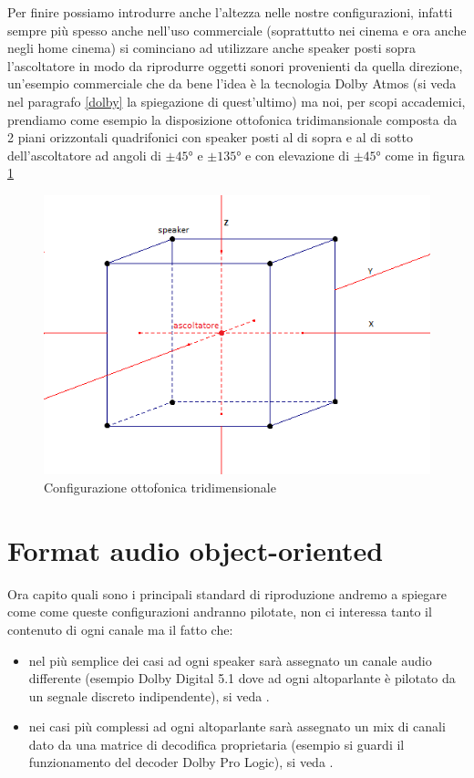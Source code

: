 \documentclass[12pt,a4paper]{report}
\begin{document}
Per finire possiamo introdurre anche l'altezza nelle nostre configurazioni, infatti sempre più spesso anche nell'uso commerciale (soprattutto nei cinema e ora anche negli home cinema) si cominciano ad utilizzare anche speaker posti sopra l'ascoltatore in modo da riprodurre oggetti sonori provenienti da quella direzione, un'esempio commerciale che da bene l'idea è la tecnologia Dolby Atmos (si veda nel paragrafo \ref{dolby} la spiegazione di quest'ultimo) ma noi, per scopi accademici, prendiamo come esempio la disposizione ottofonica tridimansionale composta da 2 piani orizzontali quadrifonici con speaker posti al di sopra e al di sotto dell'ascoltatore ad angoli di $\pm45°$ e $\pm135°$ e con elevazione di $\pm 45°$ come in figura \ref{fig:ottofonia}

\begin{figure}[htbp]
	\centering
	\includegraphics[scale=0.70]{figures/cubo4.png}
	\caption {Configurazione ottofonica tridimensionale} 
	\label{fig:ottofonia}
	\end{figure}

\section{Format audio object-oriented}

Ora capito quali sono i principali standard di riproduzione andremo a spiegare come come queste configurazioni andranno pilotate, non ci interessa tanto il contenuto di ogni canale ma il fatto che: 

\begin{itemize}
\item nel più semplice dei casi ad ogni speaker sarà assegnato un canale audio differente (esempio Dolby Digital 5.1 dove ad ogni altoparlante è pilotato da un segnale discreto indipendente), si veda \cite{digital}.
\item nei casi più complessi ad ogni altoparlante sarà assegnato un mix di canali dato da una matrice di decodifica proprietaria (esempio si guardi il funzionamento del decoder Dolby Pro Logic), si veda \cite{prologic}.
\end{itemize}
\end{document}
